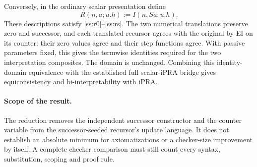 Conversely, in the ordinary scalar presentation define
\[
                    R(n,a;u.h):=I(n,Sa;u.h).
\]
These descriptions satisfy \eqref{ss:r0}--\eqref{ss:rs}.  The two
numerical translations preserve zero and successor, and each translated
recursor agrees with the original by EI on its counter: their zero
values agree and their step functions agree.  With passive parameters
fixed, this gives the termwise identities required for the two
interpretation composites.  The domain is unchanged.  Combining this
identity-domain equivalence with the established full scalar-iPRA
bridge gives equiconsistency and bi-interpretability with iPRA.

\paragraph{Scope of the result.}
The reduction removes the independent successor constructor and the
counter variable from the successor-seeded recursor's update language.
It does not establish an absolute minimum for axiomatizations or a
checker-size improvement by itself.  A complete checker comparison
must still count every syntax, substitution, scoping and proof rule.

